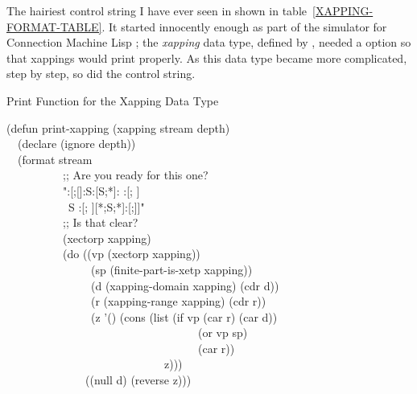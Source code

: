 \begin{new}
The hairiest  control string I have ever seen in shown
in table~\ref{XAPPING-FORMAT-TABLE}.
It started innocently enough as part of the simulator for Connection Machine Lisp
\cite{CONNECTION-MACHINE-LISP,CMLISP-IMPLEMENTATION}; the \emph{xapping} data type,
defined by , needed a  option so that
xappings would print properly.  As this data type became more complicated, step by step,
so did the  control string.
\end{new}
\begin{table}[t]
\caption{Print Function for the Xapping Data Type}
\label{XAPPING-FORMAT-TABLE}
\begingroup
\small
\begin{lisp}
(defun print-xapping (xapping stream depth) \\
~~(declare (ignore depth)) \\
~~(format stream \\
~~~~~~~~~~;; Are you ready for this one? \\
~~~~~~~~~~"{\Xtilde}:[{\Xlbrace}{\Xtilde};[{\Xtilde}]{\Xtilde}:{\Xlbrace}{\Xtilde}S{\Xtilde}:[{\Xarrowright}{\Xtilde}S{\Xtilde};{\Xtilde}*{\Xtilde}]{\Xtilde}:{\Xcircumflex} {\Xtilde}{\Xrbrace}{\Xtilde}:[{\Xtilde}; {\Xtilde}]{\Xtilde} \\
~~~~~~~~~~~{\Xtilde}{\Xlbrace}{\Xtilde}S{\Xarrowright}{\Xtilde}{\Xcircumflex} {\Xtilde}{\Xrbrace}{\Xtilde}:[{\Xtilde}; {\Xtilde}]{\Xtilde}[{\Xtilde}*{\Xtilde};{\Xarrowright}{\Xtilde}S{\Xtilde};{\Xarrowright}{\Xtilde}*{\Xtilde}]{\Xtilde}:[{\Xrbrace}{\Xtilde};]{\Xtilde}]" \\
~~~~~~~~~~;; Is that clear? \\
~~~~~~~~~~(xectorp xapping) \\
~~~~~~~~~~(do ((vp (xectorp xapping)) \\
~~~~~~~~~~~~~~~(sp (finite-part-is-xetp xapping)) \\
~~~~~~~~~~~~~~~(d (xapping-domain xapping) (cdr d)) \\
~~~~~~~~~~~~~~~(r (xapping-range xapping) (cdr r)) \\
~~~~~~~~~~~~~~~(z '() (cons (list (if vp (car r) (car d)) \\
~~~~~~~~~~~~~~~~~~~~~~~~~~~~~~~~~~(or vp sp) \\
~~~~~~~~~~~~~~~~~~~~~~~~~~~~~~~~~~(car r)) \\
~~~~~~~~~~~~~~~~~~~~~~~~~~~~z))) \\
~~~~~~~~~~~~~~((null d) (reverse z))) \\

\end{lisp}
\end{table}
